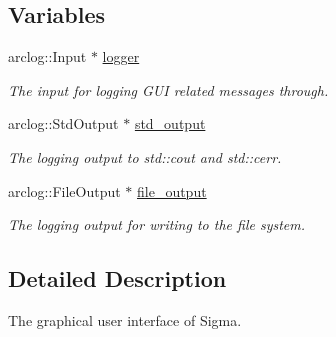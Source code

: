 \subsection*{Variables}
\begin{DoxyCompactItemize}
\item 
\hypertarget{namespacesigma_1_1gui_a9d8c6737746c5e1adb36699753b9c779}{}arclog\+::\+Input $\ast$ \hyperlink{namespacesigma_1_1gui_a9d8c6737746c5e1adb36699753b9c779}{logger}\label{namespacesigma_1_1gui_a9d8c6737746c5e1adb36699753b9c779}

\begin{DoxyCompactList}\small\item\em The input for logging G\+U\+I related messages through. \end{DoxyCompactList}\item 
\hypertarget{namespacesigma_1_1gui_aee3d12d4541eed9a3ad5e1681e2d33f4}{}arclog\+::\+Std\+Output $\ast$ \hyperlink{namespacesigma_1_1gui_aee3d12d4541eed9a3ad5e1681e2d33f4}{std\+\_\+output}\label{namespacesigma_1_1gui_aee3d12d4541eed9a3ad5e1681e2d33f4}

\begin{DoxyCompactList}\small\item\em The logging output to std\+::cout and std\+::cerr. \end{DoxyCompactList}\item 
\hypertarget{namespacesigma_1_1gui_a4dac0343b8b9c88faaf3a39bf298e690}{}arclog\+::\+File\+Output $\ast$ \hyperlink{namespacesigma_1_1gui_a4dac0343b8b9c88faaf3a39bf298e690}{file\+\_\+output}\label{namespacesigma_1_1gui_a4dac0343b8b9c88faaf3a39bf298e690}

\begin{DoxyCompactList}\small\item\em The logging output for writing to the file system. \end{DoxyCompactList}\end{DoxyCompactItemize}


\subsection{Detailed Description}
The graphical user interface of Sigma. 
